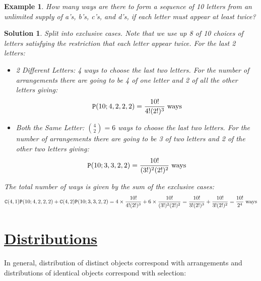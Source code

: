 \documentclass[12pt, letterpaper, onecolumn, conference, final]{IEEEtran}
\theoremstyle{definition}
\theoremstyle{plain}
\newtheorem{example}{Example}[section]
\newtheorem{solution}{Solution}[section]
\begin{document}
\begin{example}
How many ways are there to form a sequence of 10 letters from an unlimited supply of a's, b's, c's, and d's, if each letter must appear at least twice?
\end{example}
\begin{solution}
Split into exclusive cases. Note that we use up 8 of 10 choices of letters satisfying the restriction that each letter appear twice. For the last 2 letters:
\begin{itemize}

\vspace{.2cm}
\item[(i)]
2 Different Letters: 4 ways to choose the last two letters. For the number of arrangements there are going to be 4 of one letter and 2 of all the other letters giving:
\begin{equation*}
\mathtt{P}(10;4,2,2,2) = \frac{10!}{4!(2!)^3} \hspace{.1cm} \text{ways}
\end{equation*}

\vspace{.2cm}
\item[(ii)]
Both the Same Letter: ${4 \choose 2} = 6$ ways to choose the last two letters. For the number of arrangements there are going to be 3 of two letters and 2 of the other two letters giving:
\begin{equation*}
\mathtt{P}(10;3,3,2,2) = \frac{10!}{(3!)^2(2!)^2} \hspace{.1cm} \text{ways}
\end{equation*}

\end{itemize}
The total number of ways is given by the sum of the exclusive cases:
\begin{equation*}
\mathtt{C}(4,1)\mathtt{P}(10;4,2,2,2) + \mathtt{C}(4,2)\mathtt{P}(10;3,3,2,2) = 4 \times \frac{10!}{4!(2!)^3} + 6 \times \frac{10!}{(3!)^2(2!)^2} = \frac{10!}{3!(2!)^3} + \frac{10!}{3!(2!)^2} = \frac{10!}{2^4} \hspace{.1cm} \text{ways}
\end{equation*}
\end{solution}

\vspace{.3cm}
\section{\textbf{\underline{Distributions}}}
\vspace{.3cm}
\noindent
In general, distribution of distinct objects correspond with arrangements and distributions of identical objects correspond with selection:
\end{document}
